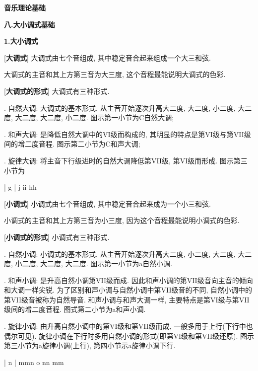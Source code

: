 

\begin{center} 
 \Large \textbf{音乐理论基础}\par
 \textbf{八.大小调式基础}
\end{center}

\large 
\begin{center}
 \textbf{1.大小调式}\\
\end{center}

[\textbf{大调式}] 大调式由七个音组成, 其中稳定音合起来组成一个大三和弦.\par
\qquad 大调式的主音和其上方第三音为大三度, 这个音程最能说明大调式的色彩.\par

[\textbf{大调式的形式}] 大调式有三种形式.\par
{}. 自然大调: 大调式的基本形式, 从主音开始逐次升高大二度, 大二度, 小二度, 大二度, 大二度, 大二度, 小二度. 图示第一小节为C自然大调;\par
{}. 和声大调: 是降低自然大调中的VI级而构成的, 其明显的特点是第VI级与第VII级间的增二度音程. 图示第二小节为C和声大调;\par
{}. 旋律大调: 将主音下行级进时的自然大调降低第VII级, 第VI级而形成. 图示第三小节为\par
\startextract
\Notes {} \en\bar
\Notes {} \fl g \en\bar
\Notes \wh j \fl i\wh i \fl h\wh h  \en
\zendextract

[\textbf{小调式}] 小调式由七个音组成, 其中稳定音合起来成为一个小三和弦.\par
\qquad 小调式的主音和其上方第三音为小三度, 因为这个音程最能说明小调式的色彩.\par

[\textbf{小调式的形式}] 小调式有三种形式.\par
{}. 自然小调: 小调式的基本形式, 从主音开始逐次升高大二度, 小二度, 大二度, 大二度, 小二度, 大二度, 大二度. 图示第一小节为a自然小调.\par
{}. 和声小调: 是升高自然小调第VII级而成. 因此和声小调的第VII级音向主音的倾向和大调一样尖锐. 为了区别和声小调与自然小调中第VII级音的不同, 自然小调中的第VII级音被称为自然导音. 和声小调与和声大调一样, 主要特点是第VI级与第VII级间的增二度音程. 图式第二小节为a和声小调.\par
{}. 旋律小调: 由升高自然小调中的第VI级和第VII级而成, 一般多用于上行(下行中也偶尔可见). 旋律小调在下行时多用自然小调的形式(即第VI级和第VII级还原). 图示第三小节为a旋律小调(上行), 第四小节示a旋律小调下行.\par
\startextract
\Notes {} \en\bar
\Notes {} \sh n \en\bar
\Notes {} \sh m\wh m\sh n\en
\zendextract
\startextract
\Notes \wh o \na n\wh n \na m\wh m  \en
\zendextract

